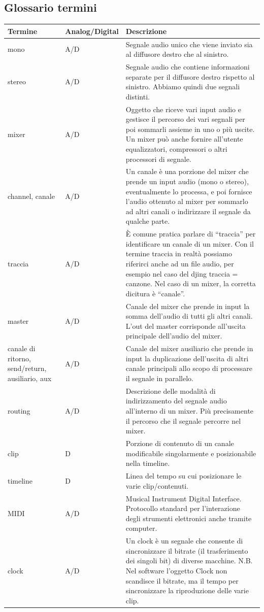 \documentclass[a4paper,12pt]{report}
\begin{document}
\subsection{Glossario termini}
\begin{center}
\begin{longtable}{| m{5em} | m{3cm}| m{7cm} |} 
 \hline
 Termine & Analog/Digital & Descrizione \\ [0.5ex] 
 \hline
 mono & A/D & Segnale audio unico che viene inviato sia al diffusore destro che al sinistro. \\ 
 \hline
 stereo & A/D & Segnale audio che contiene informazioni separate per il diffusore destro rispetto al sinistro.
Abbiamo quindi due segnali distinti. \\
 \hline
 mixer & A/D & Oggetto che riceve vari input audio e gestisce il percorso dei vari segnali  per poi sommarli assieme in uno o più uscite.
Un mixer può anche fornire all’utente equalizzatori, compressori o altri processori di segnale. \\
 \hline
 channel, canale & A/D & Un canale è una porzione del mixer che prende un input audio (mono o stereo), eventualmente lo processa, e poi fornisce l’audio ottenuto al mixer per sommarlo ad altri canali o indirizzare il segnale da qualche parte. \\
 \hline
 traccia & A/D & È comune pratica parlare di “traccia” per identificare un canale di un mixer. Con il termine traccia in realtà possiamo riferirci anche ad un file audio, per esempio nel caso del djing traccia = canzone. Nel caso di un mixer, la corretta dicitura è “canale”. \\ 
 \hline
 master & A/D & Canale del mixer che prende in input la somma dell’audio di tutti gli altri canali. L’out del master corrisponde all’uscita principale dell’audio del mixer. \\
 \hline 
 canale di ritorno, send/return, ausiliario, aux & A/D & Canale del mixer ausiliario che prende in input la duplicazione dell’uscita di altri canale principali allo scopo di processare il segnale in parallelo. \\
 \hline
 routing & A/D & Descrizione delle modalità di indirizzamento del segnale audio all’interno di un mixer. Più precisamente il percorso che il segnale percorre nel mixer. \\
 \hline
 clip & D & Porzione di contenuto di un canale modificabile singolarmente e posizionabile nella timeline. \\
 \hline
 timeline & D & Linea del tempo su cui posizionare le varie clip/contenuti. \\
 \hline
 MIDI & A/D & Musical Instrument Digital Interface.
Protocollo standard per l’interazione degli strumenti elettronici anche tramite computer. \\
\hline
clock & A/D & Un clock è un segnale che consente di sincronizzare il bitrate (il trasferimento dei singoli bit) di diverse macchine.
N.B.
Nel software l’oggetto Clock non scandisce il bitrate, ma il tempo per sincronizzare la riproduzione delle varie clip. \\
\hline
\end{longtable}
\end{center}
\end{document}
